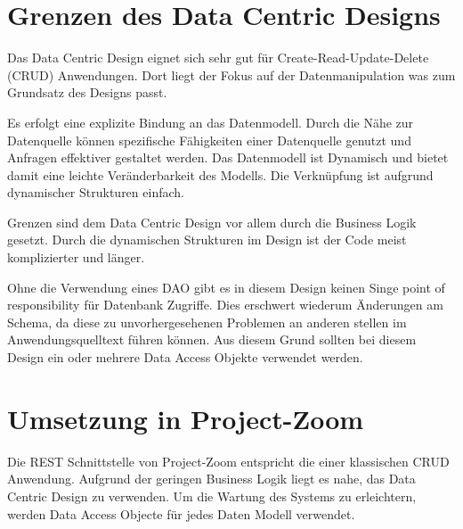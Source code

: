 \section{Grenzen des Data Centric Designs}
Das Data Centric Design eignet sich sehr gut für Create-Read-Update-Delete (CRUD) Anwendungen. Dort liegt der Fokus auf der Datenmanipulation was zum Grundsatz des Designs passt.

Es erfolgt eine explizite Bindung an das Datenmodell. Durch die Nähe zur Datenquelle können spezifische Fähigkeiten einer Datenquelle genutzt und Anfragen effektiver gestaltet werden. Das Datenmodell ist Dynamisch und bietet damit eine leichte Veränderbarkeit des Modells. Die Verknüpfung ist aufgrund dynamischer Strukturen einfach.

Grenzen sind dem Data Centric Design vor allem durch die Business Logik gesetzt. Durch die dynamischen Strukturen im Design ist der Code meist komplizierter und länger.

Ohne die Verwendung eines DAO gibt es in diesem Design keinen Singe point of responsibility für Datenbank Zugriffe. Dies erschwert wiederum Änderungen am Schema, da diese zu unvorhergesehenen Problemen an anderen stellen im Anwendungsquelltext führen können. Aus diesem Grund sollten bei diesem Design ein oder mehrere Data Access Objekte verwendet werden.

\section{Umsetzung in Project-Zoom}
Die REST Schnittstelle von Project-Zoom entspricht die einer klassischen CRUD Anwendung. Aufgrund der geringen Business Logik liegt es nahe, das Data Centric Design zu verwenden. Um die Wartung des Systems zu erleichtern, werden Data Access Objecte für jedes Daten Modell verwendet.



